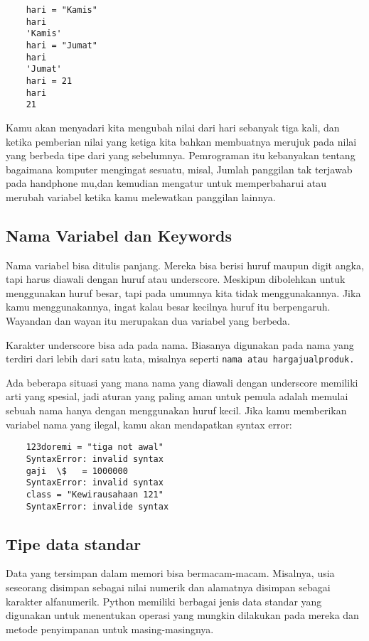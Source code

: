 \begin{verbatim}
	hari = "Kamis" 
	hari 
	'Kamis'
	hari = "Jumat" 
	hari 
	'Jumat' 
	hari = 21
	hari 
	21 
\end{verbatim}
Kamu akan menyadari kita mengubah nilai dari hari sebanyak tiga kali, dan ketika pemberian nilai yang ketiga kita bahkan membuatnya merujuk pada nilai yang berbeda tipe dari yang sebelumnya. 
Pemrograman itu kebanyakan tentang bagaimana komputer mengingat sesuatu, misal, Jumlah panggilan tak terjawab pada handphone mu,dan kemudian mengatur untuk memperbaharui atau merubah variabel ketika kamu melewatkan panggilan lainnya. 

\subsection{Nama Variabel dan Keywords}
	Nama variabel bisa ditulis panjang. Mereka bisa berisi huruf maupun digit angka, tapi harus diawali dengan huruf atau underscore. Meskipun dibolehkan untuk menggunakan huruf besar, tapi pada umumnya kita tidak menggunakannya. Jika kamu menggunakannya, ingat kalau besar kecilnya huruf itu berpengaruh. Wayandan dan wayan itu merupakan dua variabel yang berbeda.


Karakter underscore  bisa ada pada nama. Biasanya digunakan pada nama yang terdiri dari lebih dari satu kata, misalnya seperti \verb|nama atau hargajualproduk.|

Ada beberapa situasi yang mana nama yang diawali dengan underscore memiliki arti yang spesial, jadi aturan yang paling aman untuk pemula adalah memulai sebuah nama hanya dengan menggunakan huruf kecil.
Jika kamu memberikan variabel nama yang ilegal, kamu akan mendapatkan syntax error: 
\begin{verbatim}
	123doremi = "tiga not awal" 
	SyntaxError: invalid syntax 
	gaji  \$   = 1000000 
	SyntaxError: invalid syntax 
	class = "Kewirausahaan 121" 
	SyntaxError: invalide syntax 
\end{verbatim}


\subsection{Tipe data standar}
Data yang tersimpan dalam memori bisa bermacam-macam. Misalnya, usia seseorang disimpan sebagai nilai numerik dan alamatnya disimpan sebagai karakter alfanumerik. Python memiliki berbagai jenis data standar yang digunakan untuk menentukan operasi yang mungkin dilakukan pada mereka dan metode penyimpanan untuk masing-masingnya.

